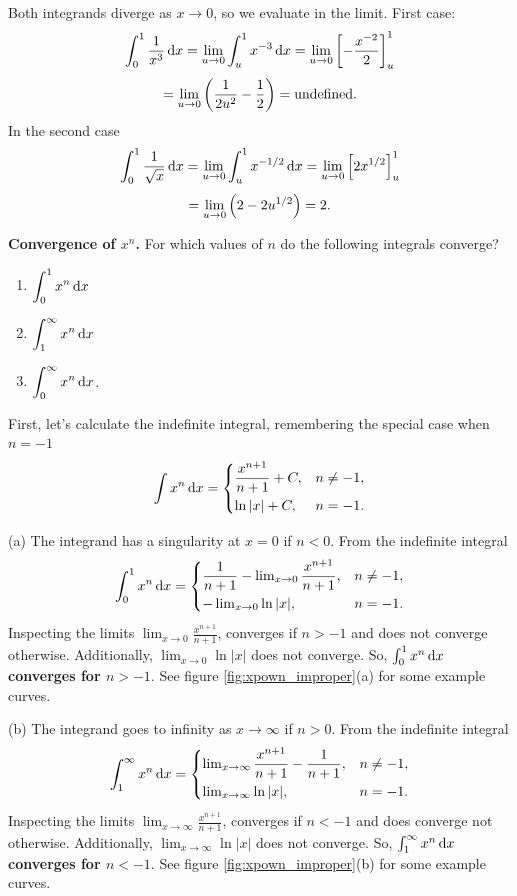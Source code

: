 \begin{solution}
Both integrands diverge as $x\to0$, so we evaluate in the limit. First case:
\[
\int_0^1\frac{1}{x^3}\,{\rm d}x
=\lim_{u\to0}\int_u^1x^{-3}\,{\rm d}x
=\lim_{u\to0}\left[-\frac{x^{-2}}{2}\right]_u^1
\]
\[
=\lim_{u\to0}\left(\frac{1}{2u^2}-\frac{1}{2}\right)
=\text{undefined}.
\]
In the second case
\[
\int_0^1\frac{1}{\sqrt{x}}\,{\rm d}x
=\lim_{u\to0}\int_u^1x^{-1/2}\,{\rm d}x
=\lim_{u\to0}\left[2x^{1/2}\right]_u^1
\]
\[
=\lim_{u\to0}\left(2-2u^{1/2}\right)=2.
\]
\end{solution}

\textbf{Convergence of $x^n$.} For which values of $n$ do the following integrals converge?
\begin{enumerate}
\item[(a)] $\displaystyle\int_0^1x^n\,{\rm d}x$
\item[(b)] $\displaystyle\int_1^\infty x^n\,{\rm d}x$
\item[(c)] $\displaystyle\int_0^\infty x^n\,{\rm d}x$.
\end{enumerate}

First, let's calculate the indefinite integral, remembering the special case when $n=-1$
\[
\int x^n\,{\rm d}x=
\begin{cases}
\dfrac{x^{n+1}}{n+1}+C,& n\neq-1,\\[2mm]
\ln|x|+C,& n=-1.
\end{cases}
\]

(a) The integrand has a singularity at $x=0$ if $n<0$. From the indefinite integral
\[
\int_0^1x^n\,{\rm d}x = 
\begin{cases}
\dfrac{1}{n+1} - \lim_{x\to0}\dfrac{x^{n+1}}{n+1},& n\neq-1,\\[2mm]
-\lim_{x\to0}\ln|x|,& n=-1.
\end{cases}
\]
Inspecting the limits $\lim_{x\to0}\frac{x^{n+1}}{n+1}$, converges if $n>-1$ and does not converge otherwise. Additionally, $\lim_{x\to0}\ln|x|$ does not converge. So, $\int_0^1x^n\,{\rm d}x$ \textbf{converges for $n>-1$}. See figure \ref{fig:xpown_improper}(a) for some example curves.

(b) The integrand goes to infinity as $x\to\infty$ if $n>0$. From the indefinite integral
\begin{align*}
\int_1^\infty x^n\,{\rm d}x = 
\begin{cases}
\lim_{x\to\infty}\dfrac{x^{n+1}}{n+1} - \dfrac{1}{n+1},& n\neq-1,\\[2mm]
\lim_{x\to\infty}\ln|x|,& n=-1.
\end{cases}
\end{align*}
Inspecting the limits $\lim_{x\to\infty}\frac{x^{n+1}}{n+1}$, converges if $n<-1$ and does converge not otherwise. Additionally, $\lim_{x\to\infty}\ln|x|$ does not converge. So, $\int_1^\infty x^n\,{\rm d}x$ \textbf{converges for $n<-1$}. See figure \ref{fig:xpown_improper}(b) for some example curves.

